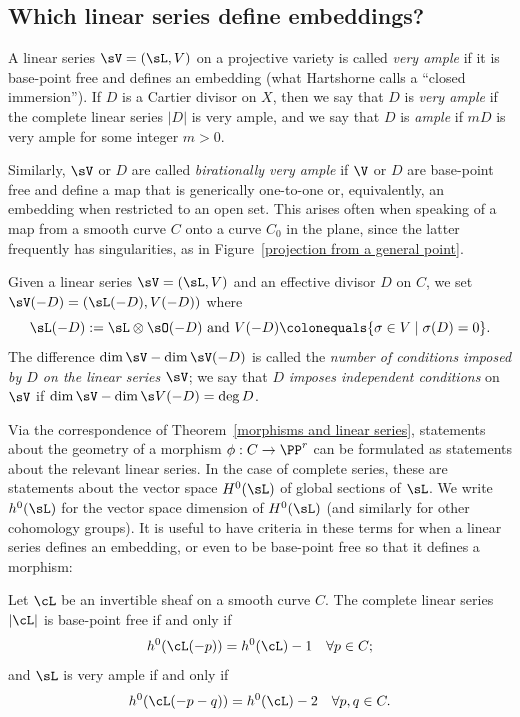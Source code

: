 \subsection*{Which linear series define embeddings?}

A linear series $\sV = (\sL, V)$ on a projective variety is called
\emph{very ample}
%
if it is base-point free and defines an embedding (what Hartshorne
calls a ``closed immersion''). If $D$ is a Cartier divisor on $X$,
then we say that $D$ is \emph{very ample} if the complete linear
series $|D|$ is very ample, and we say that $D$ is
\emph{ample}
%
if
$mD$ is very ample for some integer $m>0$.

Similarly, $\sV$ or $D$ are called
\emph{birationally very ample}
%
if $\V$ or $D$ are base-point free and define a map that is generically one-to-one or, equivalently,
an embedding when restricted to an open set. This arises often when speaking of a map from a smooth
curve $C$ onto a curve $C_{0}$ in the plane, since the latter frequently has singularities, as in Figure~\ref{projection from a general point}.

Given a linear series $\sV = (\sL, V)$ and an effective divisor $D$ on $C$, we  set
$
\sV(-D) = (\sL(-D),V(-D))
$
where
$$
\sL(-D): = \sL \otimes \sO(-D)\hbox{ and } V(-D) \colonequals \{ \sigma \in V \mid \sigma(D) = 0 \}.
$$
The difference $\dim \sV - \dim \sV(-D)$ is called the \emph{number of conditions imposed by $D$ on the linear series $\sV$}; we say that $D$ \emph{imposes independent conditions} on $\sV$ if $\dim \sV - \dim \s V(-D) = \deg D$.

Via the correspondence of Theorem~\ref{morphisms and linear series}, statements about the geometry of a morphism $\phi : C \to \PP^r$ can be formulated as statements about the relevant linear series. In the case of complete series, these are statements about the vector space $H^{0}(\sL)$ of global sections of $\sL$. We write $h^{0}(\sL)$ for the vector space dimension of $H^0(\sL)$ (and similarly for other cohomology groups). It is useful to have criteria
in these terms for when a linear series defines an embedding, or even to be base-point free so that it
defines a morphism:

\begin{proposition}\label{very ample}
{\rm\cite[Theorem IV.3.1]{Hartshorne1977}}
Let $\cL$ be an invertible sheaf on a smooth curve $C$. The complete linear series $|\cL|$ is base-point free if and only if
$$
h^0(\cL(-p)) = h^0(\cL) - 1 \quad \forall p \in C;
$$
and $\sL$ is very ample if and only if
$$
h^0(\cL(-p-q)) = h^0(\cL) - 2 \quad \forall p, q \in C.
\vspace*{-\parskip}
$$
\end{proposition}

